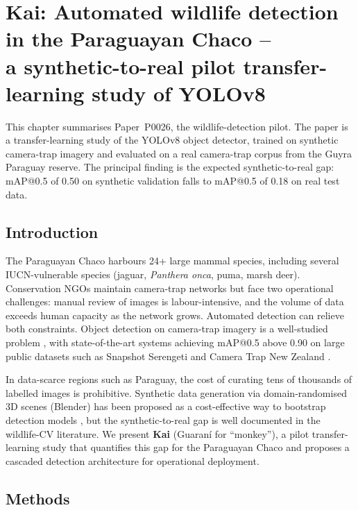 
\chapter{Kai: Automated wildlife detection in the Paraguayan Chaco -- \\
       a synthetic-to-real pilot transfer-learning study of YOLOv8}
\label{ch:kai}

This chapter summarises Paper~P0026, the wildlife-detection pilot. The
paper is a transfer-learning study of the YOLOv8 object detector,
trained on synthetic camera-trap imagery and evaluated on a real
camera-trap corpus from the Guyra Paraguay reserve. The principal
finding is the expected synthetic-to-real gap: mAP@0.5 of 0.50 on
synthetic validation falls to mAP@0.5 of 0.18 on real test data.

\section{Introduction}
\label{sec:kai-intro}

The Paraguayan Chaco harbours 24+ large mammal species, including
several IUCN-vulnerable species (jaguar, \textit{Panthera onca}, puma,
marsh deer). Conservation NGOs maintain camera-trap networks but face
two operational challenges: manual review of images is labour-intensive,
and the volume of data exceeds human capacity as the network grows.
Automated detection can relieve both constraints. Object detection on
camera-trap imagery is a well-studied problem
\citep{beery2018,norouzzadeh2018,villon2020,tabak2019,bowers2021,milani2022},
with state-of-the-art systems achieving mAP@0.5 above 0.90 on large
public datasets such as Snapshot Serengeti and Camera Trap
New Zealand \citep{chen2020}.

In data-scarce regions such as Paraguay, the cost of curating tens of
thousands of labelled images is prohibitive. Synthetic data generation
via domain-randomised 3D scenes (Blender) has been proposed as a
cost-effective way to bootstrap detection models
\citep{beery2018}, but the synthetic-to-real gap is well documented
in the wildlife-CV literature. We present \textbf{Kai} (Guaran\'i for
``monkey''), a pilot transfer-learning study that quantifies this gap
for the Paraguayan Chaco and proposes a cascaded detection architecture
for operational deployment.

\section{Methods}
\label{sec:kai-methods}

